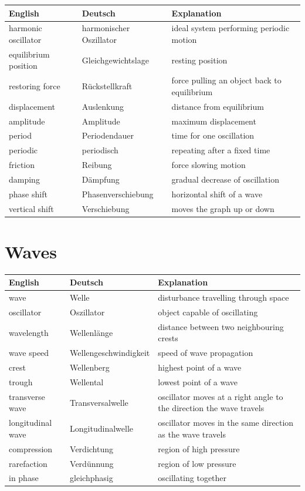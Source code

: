 \begin{tabular}{p{}p{}p{}}
\textbf{English} & \textbf{Deutsch} & \textbf{Explanation} \\ \hline
harmonic oscillator & harmonischer Oszillator & ideal system performing periodic motion \\
equilibrium position & Gleichgewichtslage & resting position \\
restoring force & Rückstellkraft & force pulling an object back to equilibrium \\
displacement & Auslenkung & distance from equilibrium \\
amplitude & Amplitude & maximum displacement \\
period & Periodendauer & time for one oscillation \\
periodic & periodisch & repeating after a fixed time \\
friction & Reibung & force slowing motion \\
damping & Dämpfung & gradual decrease of oscillation \\
phase shift & Phasenverschiebung & horizontal shift of a wave \\
vertical shift & Verschiebung & moves the graph up or down \\
\end{tabular}

\vspace{0.7cm}

\section*{Waves}

\begin{tabular}{p{}p{}p{}}
\textbf{English} & \textbf{Deutsch} & \textbf{Explanation} \\ \hline
wave & Welle & disturbance travelling through space \\
oscillator & Oszillator & object capable of oscillating \\
wavelength & Wellenlänge & distance between two neighbouring crests \\
wave speed & Wellengeschwindigkeit & speed of wave propagation \\
crest & Wellenberg & highest point of a wave \\
trough & Wellental & lowest point of a wave \\
transverse wave & Transversalwelle & oscillator moves at a right angle to the direction the wave travels\\
longitudinal wave & Longitudinalwelle & oscillator moves in the same direction as the wave travels \\
compression & Verdichtung & region of high pressure \\
rarefaction & Verdünnung & region of low pressure \\
in phase & gleichphasig & oscillating together \\
\end{tabular}

